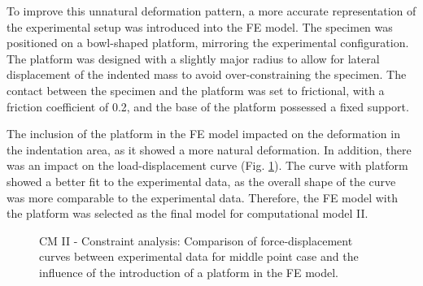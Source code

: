 To improve this unnatural deformation pattern, a more accurate representation of the 
experimental setup was introduced into the FE model. The specimen was positioned on a bowl-shaped
platform, mirroring the experimental configuration. The platform was designed with a slightly major radius to allow 
for lateral displacement of the indented mass to avoid over-constraining the specimen. The contact 
between the specimen and the platform was set to frictional, with a friction coefficient of \SI{0.2}{}, and the base of the platform 
possessed a fixed support.

The inclusion of the platform in the FE model impacted on the deformation in the indentation area, 
as it showed a more natural deformation. In addition, there was an impact on the load-displacement curve (Fig. \ref{fig:noplatformvsplatform}). 
The curve with platform showed a better fit to the experimental data, as the overall shape of the curve was more 
comparable to the experimental data. Therefore, the FE model with the platform was selected as the final model for computational 
model II.\\
\begin{figure}%
    \centering
   \quad
   \caption[CM II: No platform vs. with platform]{CM II - Constraint analysis: Comparison of force-displacement curves between experimental data for middle point case and the influence of the introduction of a platform in the FE model.}%
   \label{fig:noplatformvsplatform}%
\end{figure}

